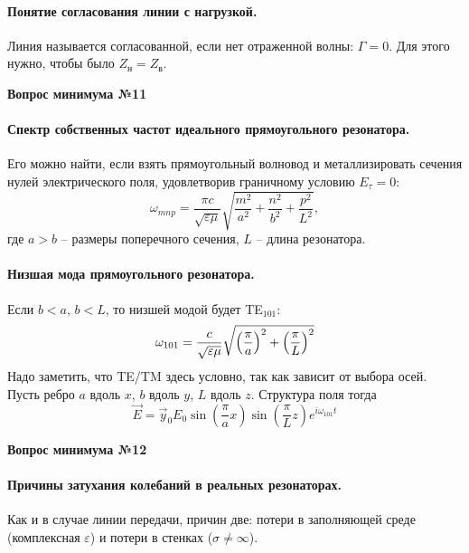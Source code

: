 \documentclass[a4paper,14pt]{extarticle}
\newcommand{\ticket}[1] {
\newpage
\hypertarget{num#1}{}
\begin{center}
	\textbf{Вопрос минимума №#1 }
\end{center}
}
\begin{document}
\paragraph{Понятие согласования линии с нагрузкой. } Линия называется согласованной, если нет отраженной волны: $\Gamma=0$. Для этого нужно, чтобы было $Z_\text{н}=Z_\text{в}$.




\ticket{11}
\paragraph{Спектр собственных частот идеального прямоугольного резонатора.} Его можно найти, если взять прямоугольный волновод и металлизировать сечения нулей электрического поля, удовлетворив граничному условию $E_\tau=0$:
\begin{equation}
	\omega_{mnp} = \frac{\pi c}{\sqrt{\varepsilon \mu}} \sqrt{\frac{m^2}{a^2}+\frac{n^2}{b^2}+\frac{p^2}{L^2}},
\end{equation}
где $a>b$ -- размеры поперечного сечения, $L$ -- длина резонатора.
\paragraph{Низшая мода прямоугольного резонатора. }%
Если $b<a$, $b<L$, то низшей модой будет TE${}_{101}$:
\begin{equation}
	\omega_{101}=\frac{c}{\sqrt{\varepsilon \mu}}\sqrt{
		\qty(\frac{\pi}{a})^2
		+\qty(\frac{\pi}{L})^2
	}
\end{equation}
Надо заметить, что TE/TM здесь условно, так как зависит от выбора осей. Пусть ребро $a$ вдоль $x$, $b$ вдоль $y$, $L$ вдоль $z$.  Структура поля тогда 
\begin{equation}
	\vec{E}=\vec{y}_0 E_0 \sin(\frac{\pi}{a}x)\sin(\frac{\pi}{L}z)e^{i\omega_{101}t}
\end{equation}








\ticket{12}
\paragraph{Причины затухания колебаний в реальных резонаторах.} Как и в случае линии передачи, причин две:
потери в заполняющей среде (комплексная $\varepsilon$) и потери в стенках ($\sigma \ne \infty$).
\end{document}
